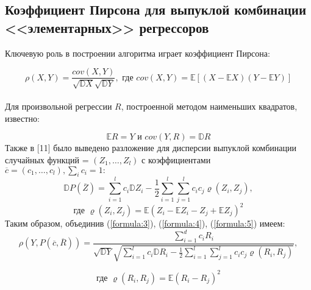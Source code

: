\documentclass{article}
\begin{document}
\subsection{Коэффициент Пирсона для выпуклой комбинации <<элементарных>> регрессоров}
Ключевую роль в построении алгоритма играет коэффициент Пирсона:

\begin{equation}
    \rho(X, Y) = \frac{cov(X, Y)}{\sqrt{\mathbb{D}X} \sqrt{\mathbb{D}Y}}, \text{ где } cov(X, Y) = \mathbb{E}[(X - \mathbb{E}X)(Y - \mathbb{E}Y)]
    \label{formula:3}
\end{equation} \\
Для произвольной регрессии $R$, построенной методом наименьших квадратов, известно:

\begin{equation}
    \mathbb{E}R = Y \text{ и } cov(Y, R) = \mathbb{D}R
    \label{formula:4}
\end{equation} 
Также в [11] было выведено разложение для дисперсии выпуклой комбинации случайных функций  = $(Z_1, \dots, Z_l)$ с коэффициентами $\overline{c} = (c_1, \dots, c_l), \sum_i c_i = 1:$
\begin{equation}   
    \mathbb{D}P(\overline{Z}) = \sum_{i=1}^l c_i \mathbb{D}Z_i - \frac{1}{2} \sum_{i=1}^l \sum_{j=1}^l c_i c_j \varrho(Z_i, Z_j),
    \label{formula:5}
\end{equation}
$$
\text{где } \varrho(Z_i, Z_j) = \mathbb{E}(Z_i - \mathbb{E}Z_i - Z_j + \mathbb{E}Z_j)^2 
$$
Таким образом, объединив (\ref{formula:3}), (\ref{formula:4}), (\ref{formula:5}) имеем:
\begin{equation}
    \rho(Y, P(\overline{c}, \overline{R})) = \frac{\sum_{i=1}^d c_iR_i}{\sqrt{\mathbb{D}Y} \sqrt{ \sum_{i=1}^l c_i \mathbb{D}R_i - \frac{1}{2} \sum_{i=1}^l \sum_{j=1}^l c_i c_j \varrho(R_i, R_j)}}, 
    \label{formula:6}
\end{equation}

$$
\text{где } \varrho(R_i, R_j) = \mathbb{E}(R_i - R_j)^2 
$$
\end{document}
